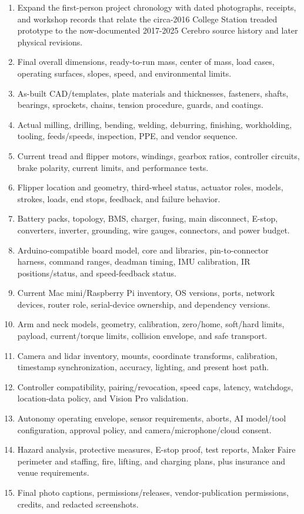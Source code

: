 \documentclass[10pt,openany]{book}
\begin{document}
\begin{enumerate}
  \item Expand the first-person project chronology with dated photographs, receipts, and workshop records that relate the circa-2016 College Station treaded prototype to the now-documented 2017-2025 Cerebro source history and later physical revisions.
  \item Final overall dimensions, ready-to-run mass, center of mass, load cases, operating surfaces, slopes, speed, and environmental limits.
  \item As-built CAD/templates, plate materials and thicknesses, fasteners, shafts, bearings, sprockets, chains, tension procedure, guards, and coatings.
  \item Actual milling, drilling, bending, welding, deburring, finishing, workholding, tooling, feeds/speeds, inspection, PPE, and vendor sequence.
  \item Current tread and flipper motors, windings, gearbox ratios, controller circuits, brake polarity, current limits, and performance tests.
  \item Flipper location and geometry, third-wheel status, actuator roles, models, strokes, loads, end stops, feedback, and failure behavior.
  \item Battery packs, topology, BMS, charger, fusing, main disconnect, E-stop, converters, inverter, grounding, wire gauges, connectors, and power budget.
  \item Arduino-compatible board model, core and libraries, pin-to-connector harness, command ranges, deadman timing, IMU calibration, IR positions/status, and speed-feedback status.
  \item Current Mac mini/Raspberry Pi inventory, OS versions, ports, network devices, router role, serial-device ownership, and dependency versions.
  \item Arm and neck models, geometry, calibration, zero/home, soft/hard limits, payload, current/torque limits, collision envelope, and safe transport.
  \item Camera and lidar inventory, mounts, coordinate transforms, calibration, timestamp synchronization, accuracy, lighting, and present host path.
  \item Controller compatibility, pairing/revocation, speed caps, latency, watchdogs, location-data policy, and Vision Pro validation.
  \item Autonomy operating envelope, sensor requirements, aborts, AI model/tool configuration, approval policy, and camera/microphone/cloud consent.
  \item Hazard analysis, protective measures, E-stop proof, test reports, Maker Faire perimeter and staffing, fire, lifting, and charging plans, plus insurance and venue requirements.
  \item Final photo captions, permissions/releases, vendor-publication permissions, credits, and redacted screenshots.
\end{enumerate}
\end{document}
